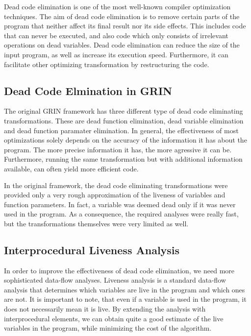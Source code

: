 \documentclass[main.tex]{subfiles}
\begin{document}
	
	Dead code elimination is one of the most well-known compiler optimization techniques. The aim of dead code elimination is to remove certain parts of the program that neither affect its final result nor its side effects. This includes code that can never be executed, and also code which only consists of irrelevant operations on dead variables. Dead code elimination can reduce the size of the input program, as well as increase its execution speed. Furthermore, it can facilitate other optimizing transformation by restructuring the code.
	
	\subsection{Dead Code Elmination in GRIN}
	
	The original GRIN framework has three different type of dead code eliminating transformations. These are dead function elimination, dead variable elimination and dead function paramater elimination. In general, the effectiveness of most optimizations solely depends on the accuracy of the information it has about the program. The more precise information it has, the more agressive it can be. Furthermore, running the same transformation but with additional information available, can often yield more efficient code.
	
	In the original framework, the dead code eliminating transformations were provided only a very rough approximation of the liveness of variables and function parameters. In fact, a variable was deemed dead only if it was never used in the program. As a consequence, the required analyses were really fast, but the transformations themselves were very limited as well.
	
	\subsection{Interprocedural Liveness Analysis}
	
	In order to improve the effectiveness of dead code elimination, we need more sophisticated data-flow analyses. Liveness analysis is a standard data-flow analysis that determines which variables are live in the program and which ones are not. It is important to note, that even if a variable is used in the program, it does not necessarily mean it is live. By extending the analysis with interprocedural elements, we can obtain quite a good estimate of the live variables in the program, while minimizing the cost of the algorithm.
	
	

	
\end{document}
